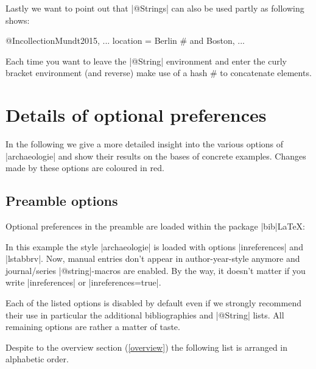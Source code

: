 \documentclass[a4paper,
10pt,
greek,
french,
spanish,
italian,
ngerman,
english
]{ltxdoc}
\begin{document}
Lastly we want to point out that |@Strings| can also be used partly as following shows:

\begin{code}
@Incollection{Mundt2015,
  ...
  location     = Berlin #{ and Boston}, %
  ...
}
\end{code}

Each time you want to leave the |@String| environment and enter the curly bracket environment (and reverse) make use of a hash \# to concatenate elements.  

\section{Details of optional preferences}\label{options-description}
In the following  we give a more detailed insight into the various options of |archaeologie| 
and show their results on the bases of concrete examples.
Changes made by these options are {\color{red}coloured in red}.

\subsection{Preamble options}\label{options-preamble}
Optional preferences in the preamble are loaded within the package |bib|\LaTeX:
\begin{code}
\usepackage[%
    backend=biber,  %
    style=archaeologie,   %
    inreferences=true,    %
    lstabbrv              %
    ]{biblatex}
\end{code}
In this example the style |archaeologie| is loaded with options |inreferences| and |lstabbrv|. 
Now, manual entries don't appear in author-year-style anymore and journal/series |@string|-macros are enabled.
By the way, it doesn't matter if you write |inreferences| or |inreferences=true|.

Each of the listed options is disabled by default even if we strongly recommend their use in particular the additional bibliographies and |@String| lists. 
All remaining options are rather a matter of taste.

Despite to the overview section (\cref{overview}) the following list is arranged in alphabetic order.
\end{document}
